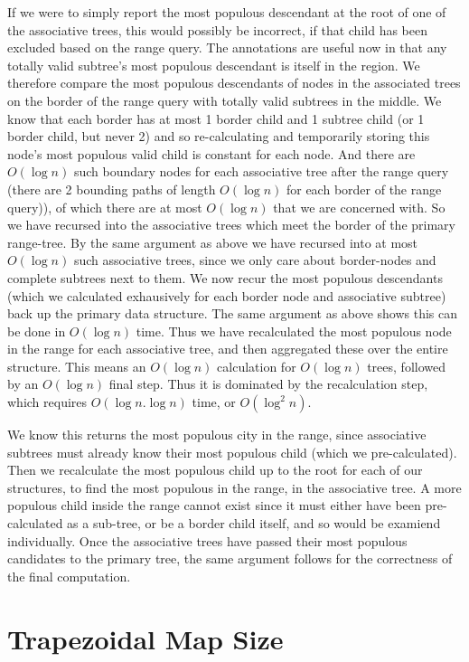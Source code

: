 \documentclass{article}
\begin{document}
If we were to simply report the most populous descendant at the root of one of the associative trees, this would possibly be incorrect, if that child has been excluded based on the range query.
The annotations are useful now in that any totally valid subtree's most populous descendant is itself in the region.
We therefore compare the most populous descendants of nodes in the associated trees on the border of the range query with totally valid subtrees in the middle.
We know that each border has at most 1 border child and 1 subtree child (or 1 border child, but never 2) and so re-calculating and temporarily storing this node's most populous valid child is constant for each node.
And there are $O(\log n)$ such boundary nodes for each associative tree after the range query (there are 2 bounding paths of length $O(\log n)$ for each border of the range query)), of which there are at most $O(\log n)$ that we are concerned with.
So we have recursed into the associative trees which meet the border of the primary range-tree.
By the same argument as above we have recursed into at most $O(\log n)$ such associative trees, since we only care about border-nodes and complete subtrees next to them.
We now recur the most populous descendants (which we calculated exhausively for each border node and associative subtree) back up the primary data structure.
The same argument as above shows this can be done in $O(\log n)$ time.
Thus we have recalculated the most populous node in the range for each associative tree, and then aggregated these over the entire structure.
This means an $O(\log n)$ calculation for $O(\log n)$ trees, followed by an $O(\log n)$ final step.
Thus it is dominated by the recalculation step, which requires $O(\log n . \log n)$ time, or $O(\log^2 n)$.

We know this returns the most populous city in the range, since associative subtrees must already know their most populous child (which we pre-calculated).
Then we recalculate the most populous child up to the root for each of our structures, to find the most populous in the range, in the associative tree.
A more populous child inside the range cannot exist since it must either have been pre-calculated as a sub-tree, or be a border child itself, and so would be examiend individually.
Once the associative trees have passed their most populous candidates to the primary tree, the same argument follows for the correctness of the final computation.

\section {Trapezoidal Map Size}
\end{document}
